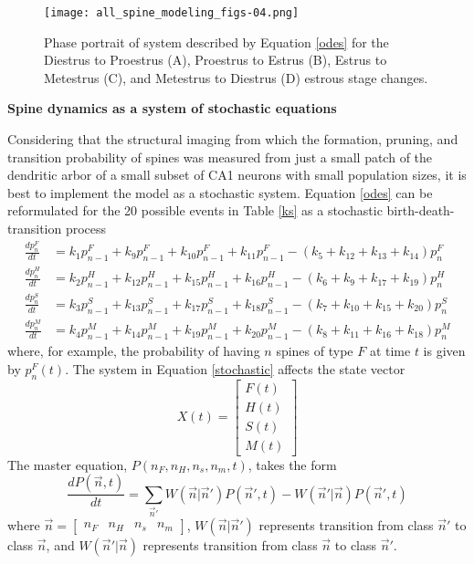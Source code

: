 \documentclass[11pt]{article}
\begin{document}
\begin{figure}
	\centering
	\texttt{[image: all\_spine\_modeling\_figs-04.png]}
	\caption{Phase portrait of system described by Equation \ref{odes} for the Diestrus to Proestrus (A), Proestrus to Estrus (B), Estrus to Metestrus (C), and Metestrus to Diestrus (D) estrous stage changes.}
	\label{fields}
\end{figure}

\vspace{10pt}
\noindent \textbf{Spine dynamics as a system of stochastic equations}

Considering that the structural imaging from which the formation, pruning, and transition probability of spines was measured from just a small patch of the dendritic arbor of a small subset of CA1 neurons with small population sizes, it is best to implement the model as a stochastic system. Equation \ref{odes} can be reformulated for the 20 possible events in Table \ref{ks} as a stochastic birth-death-transition process
\begin{equation} \begin{split}
\frac{dp_n^F}{dt} &= k_1p_{n-1}^F + k_9p_{n-1}^F + k_{10}p_{n-1}^F + k_{11}p_{n-1}^F - (k_5 + k_{12} + k_{13} + k_{14})p_n^F \\
\frac{dp_n^H}{dt} &= k_2p_{n-1}^H + k_{12}p_{n-1}^H + k_{15}p_{n-1}^H + k_{16}p_{n-1}^H- (k_6 + k_9 + k_{17} + k_{19})p_n^H \\
\frac{dp_n^S}{dt} &= k_3p_{n-1}^S + k_{13}p_{n-1}^S + k_{17}p_{n-1}^S + k_{18}p_{n-1}^S - (k_7 + k_{10} + k_{15} + k_{20})p_n^S \\
\frac{dp_n^M}{dt} &= k_4p_{n-1}^M+ k_{14}p_{n-1}^M + k_{19}p_{n-1}^M+ k_{20}p_{n-1}^M- (k_8 + k_{11} + k_{16} + k_{18})p_n^M
\label{stochastic}
\end{split} \end{equation}
where, for example, the probability of having $n$ spines of type $F$ at time $t$ is given by $p_n^{F}(t)$. The system in Equation \ref{stochastic} affects the state vector
\[X(t)=\begin{bmatrix}F(t)\\H(t)\\S(t)\\M(t)\end{bmatrix}\]
The master equation, $P(n_F, n_H, n_s, n_m, t)$, takes the form
\begin{equation}
\frac{dP(\vec{n},t)}{dt}=\sum_{\vec{n}'} W(\vec{n}|\vec{n}')P(\vec{n}',t) - W(\vec{n}'|\vec{n})P(\vec{n}',t)
\label{master}
\end{equation}
where $\vec{n}=\begin{bmatrix}n_F&n_H&n_s&n_m\end{bmatrix}$, $W(\vec{n}|\vec{n}')$ represents transition from class $\vec{n}'$ to class $\vec{n}$, and $W(\vec{n}'|\vec{n})$ represents transition from class $\vec{n}$ to class $\vec{n}'$.
\end{document}
